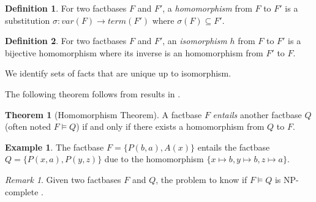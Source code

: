 \documentclass{article}
\theoremstyle{definition}
\newtheorem{definition}{Definition}[section]
\newtheorem{theorem}{Theorem}[section]
\newtheorem{example}{Example}[section]
\theoremstyle{remark}
\newtheorem{remark}{Remark}[section]
\begin{document}
\begin{definition}
For two factbases $F$ and $F'$, a \emph{homomorphism} from $F$ to $F'$ is a substitution $\sigma:var(F) \to term(F')$ where $\sigma(F) \subseteq F'$.
\end{definition}

\begin{definition}
For two factbases $F$ and $F'$, an \emph{isomorphism} $h$ from $F$ to $F'$ is a bijective homomorphism where its inverse is an homomorphism from $F'$ to $F$. 
\end{definition}

We identify sets of facts that are unique up to isomorphism.


The following theorem follows from results in \cite{base}.

\begin{theorem}[Homomorphism Theorem]
A factbase $F$ \emph{entails} another factbase $Q$ (often noted $F \models Q$) if and only if there exists a homomorphism from $Q$ to $F$.
\end{theorem}

\begin{example}
The factbase $F = \{P(b,a),A(x)\}$ entails the factbase $Q = \{P(x,a),P(y,z)\}$ due to the homomorphism $\{x \mapsto b, y \mapsto b, z \mapsto a \}$.
\end{example}

\begin{remark}
Given two factbases $F$ and $Q$, the problem to know if $F \models Q$ is NP-complete \cite{NP}. 
\end{remark}
\end{document}
